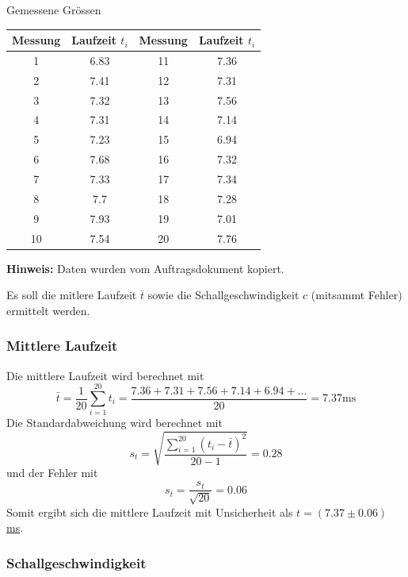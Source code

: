 \begin{center}
    \begin{threeparttable}
        \caption{Gemessene Gr\"ossen}
        \begin{tabular}{cccc}
            \toprule
            Messung & Laufzeit $t_i$ & Messung & Laufzeit $t_i$ \\
            \midrule
            1  & 6.83 & 11 & 7.36 \\
            2  & 7.41 & 12 & 7.31 \\
            3  & 7.32 & 13 & 7.56 \\
            4  & 7.31 & 14 & 7.14 \\
            5  & 7.23 & 15 & 6.94 \\
            6  & 7.68 & 16 & 7.32 \\
            7  & 7.33 & 17 & 7.34 \\
            8  & 7.7  & 18 & 7.28 \\
            9  & 7.93 & 19 & 7.01 \\
            10 & 7.54 & 20 & 7.76 \\
           \bottomrule
        \end{tabular}
        \begin{tablenotes}
            \small
            \item \textbf{Hinweis:} Daten wurden vom Auftragsdokument kopiert.
        \end{tablenotes}
        \label{table:schallgeschwindigkeit}
    \end{threeparttable}
\end{center}

Es soll die mitlere Laufzeit $\bar{t}$ sowie die Schallgeschwindigkeit $c$ (mitsammt Fehler) ermittelt werden.


\subsubsection*{Mittlere Laufzeit}

Die mittlere Laufzeit wird berechnet mit
\[ \bar{t} = \frac{1}{20} \sum_{i=1}^{20} t_i = \frac{7.36+7.31+7.56+7.14+6.94+\ldots}{20} = 7.37 \textrm{ms} \]
Die Standardabweichung wird berechnet mit
\[ s_t = \sqrt{ \frac{ \sum_{i=1}^{20} (t_i - \bar{t})^2 }{20-1} } = 0.28\]
und der Fehler mit
\[ s_{\bar{t}} = \frac{s_t}{\sqrt{20}} = 0.06 \]
Somit ergibt sich die mittlere Laufzeit mit Unsicherheit als \underline{\underline{$t = (7.37 \pm 0.06)$ ms}}.


\subsubsection*{Schallgeschwindigkeit}

